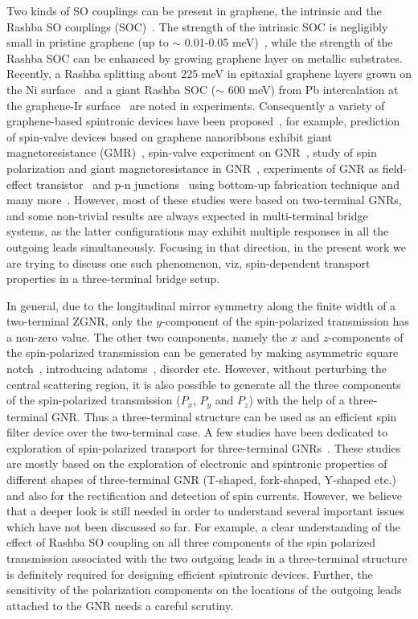 \documentclass[prb,aps,twocolumn,amsmath,amssymb,floatfix,
superscriptaddress]{revtex4}
\begin{document}
Two kinds of SO couplings can be present in graphene, the intrinsic
and the Rashba SO couplings (SOC)~\cite{km1,km2}. The strength of the
intrinsic SOC is negligibly small in pristine graphene (up to $\sim$
0.01-0.05 meV)~\cite{yao-prb,jc-prb}, while the strength of the Rashba
SOC can be enhanced by growing graphene layer on metallic
substrates. Recently, a Rashba splitting about 225 meV in epitaxial
graphene layers grown on the Ni surface~\cite{dedcov} and a giant
Rashba SOC ($\sim$ 600 meV) from Pb intercalation at the graphene-Ir
surface~\cite{calleja} are noted in experiments. Consequently a
variety of graphene-based spintronic devices have been
proposed~\cite{frank,zeng,kim,jozsa,y-t,bennett,cai,chico,qzhang}, for
example, prediction of spin-valve devices based on graphene
nanoribbons exhibit giant magnetoresistance (GMR)~\cite{kim},
spin-valve experiment on GNR~\cite{jozsa}, study of spin polarization
and giant magnetoresistance in GNR~\cite{y-t}, experiments of GNR as
field-effect transistor~\cite{bennett} and p-n junctions~\cite{cai}
using bottom-up fabrication technique and many
more~\cite{chico,qzhang}. However, most of these studies were based on
two-terminal GNRs, and some non-trivial results are always expected in
multi-terminal bridge systems, as the latter configurations may
exhibit multiple responses in all the outgoing leads
simultaneously. Focusing in that direction, in the present work we are
trying to discuss one such phenomenon, viz, spin-dependent transport
properties in a three-terminal bridge setup.

In general, due to the longitudinal mirror symmetry along the finite
width of a two-terminal ZGNR, only the $y$-component of the
spin-polarized transmission has a non-zero value. The other two
components, namely the $x$ and $z$-components of the spin-polarized
transmission can be generated by making asymmetric square
notch~\cite{qzhang}, introducing adatoms~\cite{sudin-mrx}, disorder
etc. However, without perturbing the central scattering region, it is
also possible to generate all the three components of the
spin-polarized transmission ($P_x$, $P_y$ and $P_z$) with the
help of a three-terminal GNR. Thus a three-terminal structure can be
used as an efficient spin filter device over the two-terminal case. A
few studies have been dedicated to exploration of spin-polarized
transport for three-terminal
GNRs~\cite{antonis,en-jia,hsin-han,jacob,lzhang-jpcm}. These studies
are mostly based on the exploration of electronic and spintronic
properties of different shapes of three-terminal GNR (T-shaped,
fork-shaped, Y-shaped etc.) and also for the rectification and
detection of spin currents. However, we believe that a
deeper look is still needed in order to understand several important
issues which have not been discussed so far. For example, a clear understanding
of the effect of Rashba SO coupling on all three components of the
spin polarized transmission associated with the two outgoing leads in
a three-terminal structure is definitely required for designing efficient spintronic devices. Further, the sensitivity of the
polarization components on the locations of the outgoing leads
attached to the GNR needs a careful scrutiny.
\end{document}
